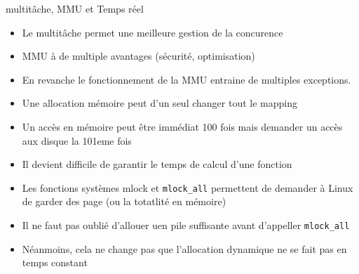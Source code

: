 



\begin{frame}{multitâche, MMU et Temps réel} 
  \begin{itemize}
  \item Le multitâche permet une meilleure gestion de la concurence
  \item MMU à de multiple avantages (sécurité, optimisation)
  \item En revanche le fonctionnement  de la MMU entraine de multiples
    exceptions.
  \item Une allocation mémoire peut d'un seul changer tout le mapping
  \item Un accès en mémoire  peut être immédiat 100 fois mais demander
    un accès aux disque la 101eme fois
  \item  Il devient  difficile de  garantir le  temps de  calcul d'une
    fonction
  \item Les fonctions systèmes mlock et \texttt{mlock\_all} permettent
    de  demander  à Linux  de  garder des  page  (ou  la totatlité  en
    mémoire)
  \item  Il ne  faut pas  oublié d'allouer  uen pile  suffisante avant
    d'appeller \texttt{mlock\_all}
  \item Néanmoins, cela ne change pas que l'allocation dynamique ne se
    fait pas en temps constant
  \end{itemize} 
\end{frame} 



